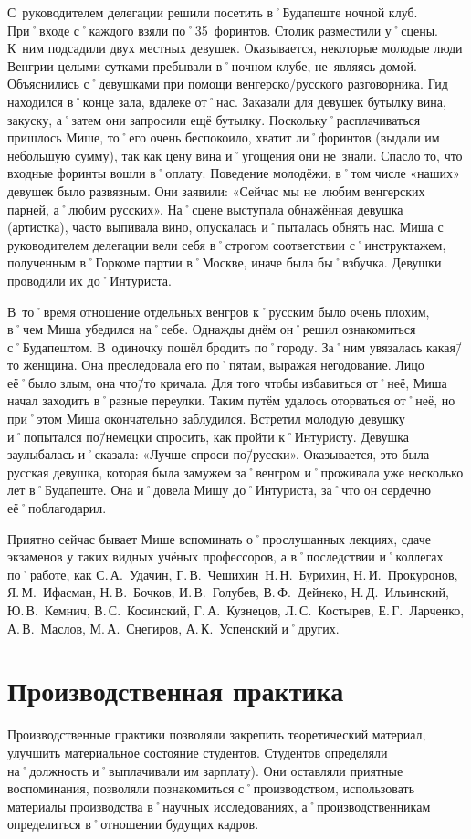 С~руководителем делегации решили посетить в˚Будапеште ночной клуб. При˚входе с˚каждого взяли по˚35~форинтов. Столик разместили у˚сцены. К~ним подсадили двух местных девушек. Оказывается, некоторые молодые люди Венгрии целыми сутками пребывали в˚ночном клубе, не~являясь домой. Объяснились с˚девушками при помощи венгерско\-/русского разговорника. Гид находился в˚конце зала, вдалеке от˚нас. Заказали для девушек бутылку вина, закуску, а˚затем они запросили ещё бутылку. Поскольку˚расплачиваться пришлось Мише, то˚его очень беспокоило, хватит ли˚форинтов (выдали им небольшую сумму), так как цену вина и˚угощения они не~знали. Спасло то, что входные форинты вошли в˚оплату. Поведение молодёжи, в˚том числе «наших» девушек было развязным. Они заявили: «Сейчас мы не~любим венгерских парней, а˚любим русских». На˚сцене выступала обнажённая девушка (артистка), часто выпивала вино, опускалась и˚пыталась обнять нас. Миша с руководителем делегации вели себя в˚строгом соответствии с˚инструктажем, полученным в˚Горкоме партии в˚Москве, иначе была бы˚взбучка. Девушки проводили их до˚Интуриста. 

В~то˚время отношение отдельных венгров к˚русским было очень плохим, в˚чем Миша убедился на˚себе.
Однажды днём он˚решил ознакомиться с˚Будапештом. В~одиночку пошёл бродить по˚городу. За˚ним увязалась какая\=/то женщина. Она преследовала его по˚пятам, выражая негодование. Лицо её˚было злым, она что\=/то кричала. Для того чтобы избавиться от˚неё, Миша начал заходить в˚разные переулки. Таким путём удалось оторваться от˚неё, но при˚этом Миша окончательно заблудился. Встретил молодую девушку и˚попытался по\=/немецки спросить, как пройти к˚Интуристу. Девушка заулыбалась и˚сказала: «Лучше спроси по\=/русски». Оказывается, это была русская девушка, которая была замужем за˚венгром и˚проживала уже несколько лет в˚Будапеште. Она и˚довела Мишу до˚Интуриста, за˚что он сердечно её˚поблагодарил. 

Приятно сейчас бывает Мише вспоминать о˚прослушанных лекциях, сдаче экзаменов у таких видных учёных профессоров, а в˚последствии и˚коллегах по˚работе, как С.\,А.~Удачин, Г.\,В.~Чешихин\, Н.\,Н.~Бурихин, Н.\,И.~Прокуронов, Я.\,М.~Ифасман, Н.\,В.~Бочков, И.\,В.~Голубев, В.\,Ф.~Дейнеко, Н.\,Д.~Ильинский, Ю.\,В.~Кемнич, В.\,С.~Косинский, Г.\,А.~Кузнецов, Л.\,С.~Костырев, Е.\,Г.~Ларченко, А.\,В.~Маслов, М.\,А.~Снегиров, А.\,К.~Успенский и˚других.

\clearpage 		%

\section*{Производственная практика}
\label{sec:productionPractices}
Производственные практики позволяли закрепить теоретический материал, улучшить материальное состояние студентов. Студентов определяли на˚должность и˚выплачивали им зарплату). Они оставляли приятные воспоминания, позволяли познакомиться с˚производством, использовать материалы производства в˚научных исследованиях, а˚производственникам определиться в˚отношении будущих кадров.

